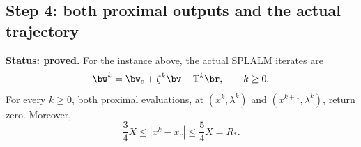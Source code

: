 \subsection{Step 4: both proximal outputs and the actual trajectory}
\label{subsec:q3-large-realization}

\begin{lemma}
\label{lem:q3-large-realization}
\textbf{Status: proved.}
For the instance above, the actual SPLALM iterates are
\[
\bw^k=\bw_c+\zeta^k\bv+\mathbb{T}^k\br,
\qquad k\ge0.
\]
For every \(k\ge0\), both proximal evaluations, at
\((x^k,\lambda^k)\) and \((x^{k+1},\lambda^k)\), return zero.
Moreover,
\begin{equation}
\frac34X\le|x^k-x_c|\le\frac54X=R_*.
\label{eq:q3-large-annulus}
\end{equation}
\end{lemma}

